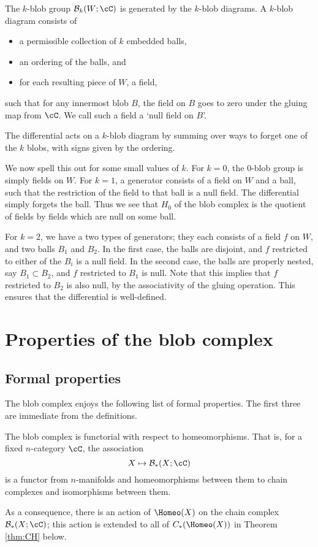 \documentclass{pnastwo}
\begin{document}
\begin{article}
The $k$-blob group $\bc_k(W; \cC)$ is generated by the $k$-blob diagrams. A $k$-blob diagram consists of
\begin{itemize}
\item a permissible collection of $k$ embedded balls,
\item an ordering of the balls, and
\item for each resulting piece of $W$, a field,
\end{itemize}
such that for any innermost blob $B$, the field on $B$ goes to zero under the gluing map from $\cC$. We call such a field a `null field on $B$'.

The differential acts on a $k$-blob diagram by summing over ways to forget one of the $k$ blobs, with signs given by the ordering.

We now spell this out for some small values of $k$. For $k=0$, the $0$-blob group is simply fields on $W$. For $k=1$, a generator consists of a field on $W$ and a ball, such that the restriction of the field to that ball is a null field. The differential simply forgets the ball. Thus we see that $H_0$ of the blob complex is the quotient of fields by fields which are null on some ball.

For $k=2$, we have a two types of generators; they each consists of a field $f$ on $W$, and two balls $B_1$ and $B_2$. In the first case, the balls are disjoint, and $f$ restricted to either of the $B_i$ is a null field. In the second case, the balls are properly nested, say $B_1 \subset B_2$, and $f$ restricted to $B_1$ is null. Note that this implies that $f$ restricted to $B_2$ is also null, by the associativity of the gluing operation. This ensures that the differential is well-defined.

\section{Properties of the blob complex}
\subsection{Formal properties}
\label{sec:properties}
The blob complex enjoys the following list of formal properties. The first three are immediate from the definitions.

\begin{property}[Functoriality]
\label{property:functoriality}%
The blob complex is functorial with respect to homeomorphisms.
That is, 
for a fixed $n$-category $\cC$, the association
\begin{equation*}
X \mapsto \bc_*(X; \cC)
\end{equation*}
is a functor from $n$-manifolds and homeomorphisms between them to chain 
complexes and isomorphisms between them.
\end{property}
As a consequence, there is an action of $\Homeo(X)$ on the chain complex $\bc_*(X; \cC)$; 
this action is extended to all of $C_*(\Homeo(X))$ in Theorem \ref{thm:CH} below.


\end{article}
\end{document}
